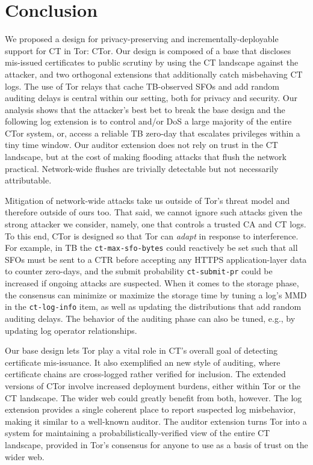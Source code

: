\section{Conclusion} \label{sec:conclusion} 

We proposed a design for privacy-preserving and incrementally-deployable support
for CT in Tor: CTor. Our design is composed of a base that discloses mis-issued
certificates to public scrutiny by using the CT landscape against the attacker,
and two orthogonal extensions that additionally catch misbehaving CT logs.  The
use of Tor relays that cache TB-observed SFOs and add random auditing delays is
central within our setting, both for privacy and security.  Our analysis shows
that the attacker's best bet to break the base design and the following log
extension is to control and/or DoS a large majority of the entire CTor system,
or, access a reliable TB zero-day that escalates privileges within a tiny time
window.  Our auditor extension does not rely on trust in the CT landscape, but
at the cost of making flooding attacks that flush the network practical.
Network-wide flushes are trivially detectable but not necessarily attributable.

Mitigation of network-wide attacks take us outside of Tor's threat model and
therefore outside of ours too.  That said, we cannot ignore such attacks given
the strong attacker we consider, namely, one that controls a trusted CA and
CT logs.  To this end, CTor is designed so that Tor can \emph{adapt} in response
to interference.  For example, in TB the \texttt{ct-max-sfo-bytes} could
reactively be set such that all SFOs must be sent to a CTR before accepting any
HTTPS application-layer data to counter zero-days, and the submit probability
\texttt{ct-submit-pr} could be increased if ongoing attacks are suspected.  When
it comes to the storage phase, the consensus can minimize or maximize the
storage time by tuning a log's MMD in the \texttt{ct-log-info} item, as well as
updating the distributions that add random auditing delays.  The behavior of the
auditing phase can also be tuned, e.g., by updating log operator relationships.

Our base design lets Tor play a vital role in CT's overall goal of detecting
certificate mis-issuance.  It also exemplified an new style of auditing, where
certificate chains are cross-logged rather verified for inclusion.  The extended
versions of CTor involve increased deployment burdens, either within Tor or the
CT landscape.  The wider web could greatly benefit from both, however.  The log
extension provides a single coherent place to report suspected log misbehavior,
making it similar to a well-known auditor.  The auditor extension turns Tor into
a system for maintaining a probabilistically-verified view of the entire CT
landscape, provided in Tor's consensus for anyone to use as a basis of trust on
the wider web.
